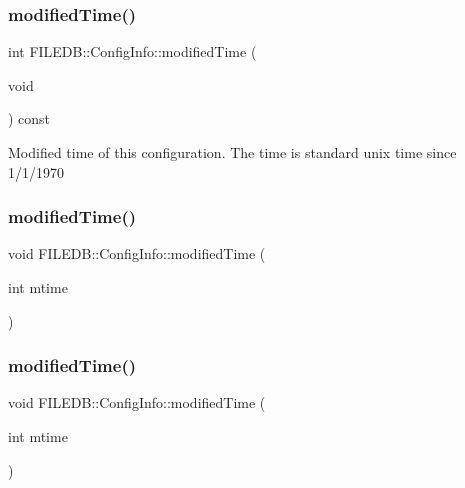 \subsubsection{\texorpdfstring{modifiedTime()}{modifiedTime()}\hspace{0.1cm}{\footnotesize\ttfamily [3/6]}}
{\footnotesize\ttfamily int F\+I\+L\+E\+D\+B\+::\+Config\+Info\+::modified\+Time (\begin{DoxyParamCaption}\item[{void}]{ }\end{DoxyParamCaption}) const}

Modified time of this configuration. The time is standard unix time since 1/1/1970 \mbox{\label{classFILEDB_1_1ConfigInfo_a5c250fc2d94faafa05f18d8126ccf0cb}} 
\subsubsection{\texorpdfstring{modifiedTime()}{modifiedTime()}\hspace{0.1cm}{\footnotesize\ttfamily [4/6]}}
{\footnotesize\ttfamily void F\+I\+L\+E\+D\+B\+::\+Config\+Info\+::modified\+Time (\begin{DoxyParamCaption}\item[{int}]{mtime }\end{DoxyParamCaption})}

\mbox{\label{classFILEDB_1_1ConfigInfo_a5c250fc2d94faafa05f18d8126ccf0cb}} 
\subsubsection{\texorpdfstring{modifiedTime()}{modifiedTime()}\hspace{0.1cm}{\footnotesize\ttfamily [5/6]}}
{\footnotesize\ttfamily void F\+I\+L\+E\+D\+B\+::\+Config\+Info\+::modified\+Time (\begin{DoxyParamCaption}\item[{int}]{mtime }\end{DoxyParamCaption})}

\mbox{\label{classFILEDB_1_1ConfigInfo_a5c250fc2d94faafa05f18d8126ccf0cb}} 
